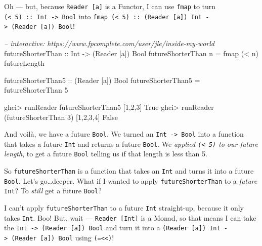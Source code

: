 \documentclass[]{article}
\newenvironment{Shaded}{}{}
\newcommand{\DataTypeTok}[1]{\textcolor[rgb]{0.56,0.13,0.00}{{#1}}}
\newcommand{\DecValTok}[1]{\textcolor[rgb]{0.25,0.63,0.44}{{#1}}}
\newcommand{\CommentTok}[1]{\textcolor[rgb]{0.38,0.63,0.69}{\textit{{#1}}}}
\newcommand{\OtherTok}[1]{\textcolor[rgb]{0.00,0.44,0.13}{{#1}}}
\newcommand{\FunctionTok}[1]{\textcolor[rgb]{0.02,0.16,0.49}{{#1}}}
\newcommand{\NormalTok}[1]{{#1}}
\begin{document}
Oh --- but, because \texttt{Reader\ {[}a{]}} is a Functor, I can use
\texttt{fmap} to turn
\texttt{(\textless{}\ 5)\ ::\ Int\ -\textgreater{}\ Bool} into
\texttt{fmap\ (\textless{}\ 5)\ ::\ (Reader\ {[}a{]})\ Int\ -\textgreater{}\ (Reader\ {[}a{]})\ Bool}!

\begin{Shaded}
\begin{Highlighting}[]
\CommentTok{-- interactive: https://www.fpcomplete.com/user/jle/inside-my-world}
\OtherTok{futureShorterThan ::} \DataTypeTok{Int} \OtherTok{->} \NormalTok{(}\DataTypeTok{Reader} \NormalTok{[a]) }\DataTypeTok{Bool}
\NormalTok{futureShorterThan n }\FunctionTok{=} \NormalTok{fmap (}\FunctionTok{<} \NormalTok{n) futureLength}

\OtherTok{futureShorterThan5 ::} \NormalTok{(}\DataTypeTok{Reader} \NormalTok{[a]) }\DataTypeTok{Bool}
\NormalTok{futureShorterThan5 }\FunctionTok{=} \NormalTok{futureShorterThan }\DecValTok{5}
\end{Highlighting}
\end{Shaded}

\begin{Shaded}
\begin{Highlighting}[]
\NormalTok{ghci}\FunctionTok{>} \NormalTok{runReader futureShorterThan5 [}\DecValTok{1}\NormalTok{,}\DecValTok{2}\NormalTok{,}\DecValTok{3}\NormalTok{]}
\DataTypeTok{True}
\NormalTok{ghci}\FunctionTok{>} \NormalTok{runReader (futureShorterThan }\DecValTok{3}\NormalTok{) [}\DecValTok{1}\NormalTok{,}\DecValTok{2}\NormalTok{,}\DecValTok{3}\NormalTok{,}\DecValTok{4}\NormalTok{]}
\DataTypeTok{False}
\end{Highlighting}
\end{Shaded}

And voilà, we have a future \texttt{Bool}. We turned an
\texttt{Int\ -\textgreater{}\ Bool} into a function that takes a future
\texttt{Int} and returns a future \texttt{Bool}. We \emph{applied
\texttt{(\textless{}\ 5)} to our future length}, to get a future
\texttt{Bool} telling us if that length is less than 5.

So \texttt{futureShorterThan} is a function that takes an \texttt{Int}
and turns it into a future \texttt{Bool}. Let's go\ldots{}deeper. What
if I wanted to apply \texttt{futureShorterThan} to a \emph{future}
\texttt{Int}? To \emph{still} get a future \texttt{Bool}?

I can't apply \texttt{futureShorterThan} to a future \texttt{Int}
straight-up, because it only takes \texttt{Int}. Boo! But, wait ---
\texttt{Reader\ {[}Int{]}} is a Monad, so that means I can take the
\texttt{Int\ -\textgreater{}\ (Reader\ {[}a{]})\ Bool} and turn it into
a
\texttt{(Reader\ {[}a{]})\ Int\ -\textgreater{}\ (Reader\ {[}a{]})\ Bool}
using \texttt{(=\textless{}\textless{})}!
\end{document}
